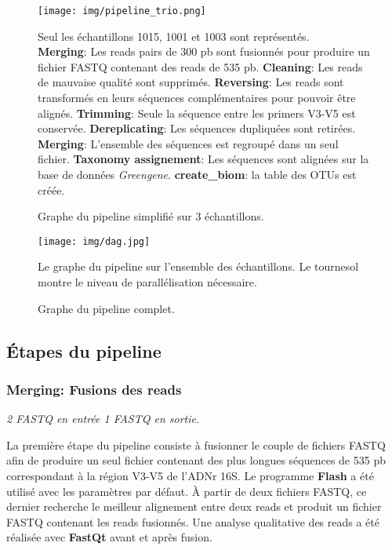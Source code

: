 \documentclass[12pt,a4paper]{article}
\begin{document}
\begin{figure}[!ht]
\begin{center}
\texttt{[image: img/pipeline\_trio.png]}\hfill
\end{center}
\caption{Graphe du pipeline simplifié sur 3 échantillons.}
Seul les échantillons 1015, 1001 et 1003 sont représentés.\\ \textbf{Merging}: Les reads pairs de 300 pb sont fusionnés  pour produire un fichier FASTQ contenant des reads de 535 pb. \textbf{Cleaning}: Les reads de mauvaise qualité sont supprimés. \textbf{Reversing}: Les reads sont transformés en leurs séquences complémentaires pour pouvoir être alignés. \textbf{Trimming}: Seule la séquence entre les primers V3-V5 est conservée. \textbf{Dereplicating}: Les séquences dupliquées sont retirées. \textbf{Merging}: L'ensemble des séquences est regroupé dans un seul fichier. \textbf{Taxonomy assignement}: Les séquences sont alignées sur la base de données \textit{Greengene}. \textbf{create\_biom}: la table des OTUs est créée.
\label{pipeline_trio}
\end{figure}


\begin{figure}[ht]
\begin{center}
\texttt{[image: img/dag.jpg]}\hfill
\end{center}
\caption{Graphe du pipeline complet.}
Le graphe du pipeline sur l'ensemble des échantillons. Le tournesol montre le niveau de parallélisation nécessaire.
\label{dag}
\end{figure}

\subsection{Étapes du pipeline}
\subsubsection{Merging: Fusions des reads}
\noindent\emph{ 2 FASTQ en entrée 1 FASTQ en sortie. }

La première étape du pipeline consiste à fusionner le couple de fichiers FASTQ afin de produire un seul fichier contenant des plus longues séquences de 535 pb correspondant à la région V3-V5 de l’ADNr 16S.
Le programme \textbf{Flash}\cite{Mago2011} a été utilisé avec les paramètres par défaut. À partir de deux fichiers FASTQ, ce dernier recherche le meilleur alignement entre deux reads et produit un fichier FASTQ contenant les reads fusionnés.
Une analyse qualitative des reads a été réalisée avec \textbf{FastQt}\citep{Labsquareteam2017} avant et après fusion.
\end{document}
